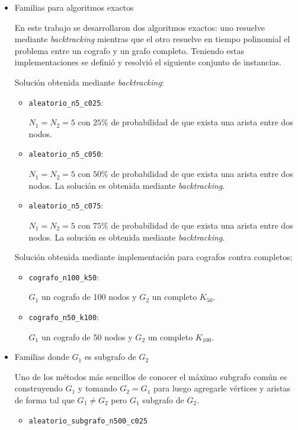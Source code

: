 \begin{itemize}
	\item Familias para algoritmos exactos

	En este trabajo se desarrollaron dos algoritmos exactos: uno resuelve
	mediante \emph{backtracking} mientras que el otro resuelve en
	tiempo polinomial el problema entre un cografo y un grafo completo. Teniendo
	estas implementaciones se definió y resolvió el siguiente conjunto de
	instancias.

	Solución obtenida mediante \emph{backtracking}:
	\begin{itemize}
		\item \texttt{aleatorio\_n5\_c025}:

			$N_1 = N_2 = 5$ con $25\%$ de probabilidad de que exista una arista
			entre dos nodos.
		\item \texttt{aleatorio\_n5\_c050}:

			$N_1 = N_2 = 5$ con $50\%$ de probabilidad de que exista una arista
			entre dos nodos. La solución es obtenida mediante \emph{backtracking}.
		\item \texttt{aleatorio\_n5\_c075}:

			$N_1 = N_2 = 5$ con $75\%$ de probabilidad de que exista una arista
			entre dos nodos. La solución es obtenida mediante \emph{backtracking}.
	\end{itemize}

	Solución obtenida mediante implementación para cografos contra completos:
	\begin{itemize}
		\item \texttt{cografo\_n100\_k50}:

			$G_1$ un cografo de 100 nodos y $G_2$ un completo $K_{50}$.
		\item \texttt{cografo\_n50\_k100}:

			$G_1$ un cografo de 50 nodos y $G_2$ un completo $K_{100}$.
	\end{itemize}

	\item Familias donde $G_1$ es subgrafo de $G_2$

	Uno de los métodos más sencillos de conocer el máximo subgrafo común es
	construyendo $G_1$ y tomando $G_2 = G_1$ para luego agregarle vértices y
	aristas de forma tal que $G_1 \neq G_2$ pero $G_1$ subgrafo de $G_2$.

	\begin{itemize}
		\item \texttt{aleatorio\_subgrafo\_n500\_c025}


\end{itemize}
\end{itemize}
